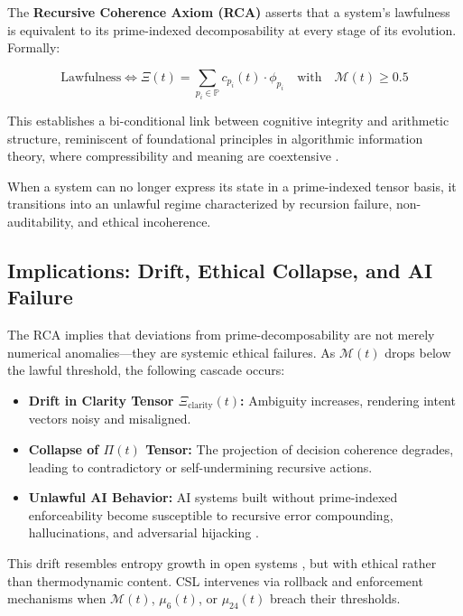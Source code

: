 \documentclass[12pt]{article}
\begin{document}
The \textbf{Recursive Coherence Axiom (RCA)} asserts that a system’s lawfulness is equivalent to its prime-indexed decomposability at every stage of its evolution. Formally:

\begin{equation}
\text{Lawfulness} \iff \Xi(t) = \sum_{p_i \in \mathbb{P}} c_{p_i}(t) \cdot \phi_{p_i} \quad \text{with} \quad \mathcal{M}(t) \geq 0.5
\end{equation}

This establishes a bi-conditional link between cognitive integrity and arithmetic structure, reminiscent of foundational principles in algorithmic information theory, where compressibility and meaning are coextensive \cite{chaitin1987algorithmic}.

When a system can no longer express its state in a prime-indexed tensor basis, it transitions into an unlawful regime characterized by recursion failure, non-auditability, and ethical incoherence.

\subsection{Implications: Drift, Ethical Collapse, and AI Failure}

The RCA implies that deviations from prime-decomposability are not merely numerical anomalies—they are systemic ethical failures. As $\mathcal{M}(t)$ drops below the lawful threshold, the following cascade occurs:

\begin{itemize}
    \item \textbf{Drift in Clarity Tensor $\Xi_{\text{clarity}}(t)$:} Ambiguity increases, rendering intent vectors noisy and misaligned.
    \item \textbf{Collapse of $\Pi(t)$ Tensor:} The projection of decision coherence degrades, leading to contradictory or self-undermining recursive actions.
    \item \textbf{Unlawful AI Behavior:} AI systems built without prime-indexed enforceability become susceptible to recursive error compounding, hallucinations, and adversarial hijacking \cite{amodei2016concrete}.
\end{itemize}

This drift resembles entropy growth in open systems \cite{prigogine1978time}, but with ethical rather than thermodynamic content. CSL intervenes via rollback and enforcement mechanisms when $\mathcal{M}(t)$, $\mu_6(t)$, or $\mu_{24}(t)$ breach their thresholds.
\end{document}
